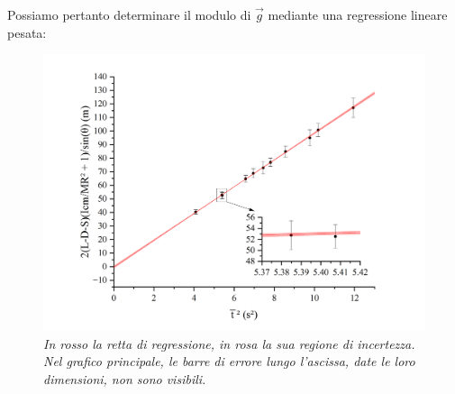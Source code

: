 \documentclass{article}
\begin{document}
Possiamo pertanto determinare il modulo di $\vec{g}$ mediante una regressione
lineare pesata:
\begin{figure}[H]
    \includegraphics[trim={1cm 0.6cm 1cm 1cm},clip,width=\textwidth]{img/Graph2.jpg}
    \caption*{\emph{
        In rosso la retta di regressione, in rosa la sua regione di incertezza. \\
        Nel grafico principale, le barre di errore lungo l'ascissa, date le loro
        dimensioni, non sono visibili.
    }}
\end{figure}
\end{document}
